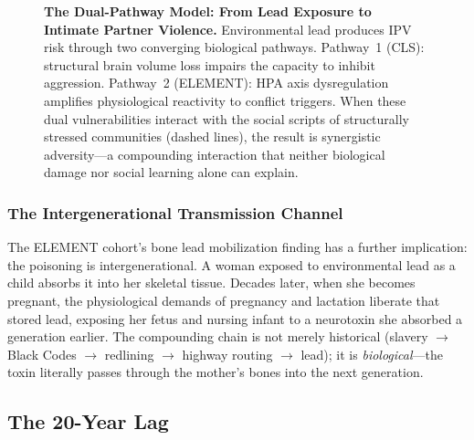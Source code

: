 \documentclass[12pt, letterpaper]{article}
\begin{document}
\begin{figure}[H]
\caption{\textbf{The Dual-Pathway Model: From Lead Exposure to Intimate Partner Violence.} Environmental lead produces IPV risk through two converging biological pathways. Pathway~1 (CLS): structural brain volume loss impairs the capacity to inhibit aggression. Pathway~2 (ELEMENT): HPA axis dysregulation amplifies physiological reactivity to conflict triggers. When these dual vulnerabilities interact with the social scripts of structurally stressed communities (dashed lines), the result is synergistic adversity---a compounding interaction that neither biological damage nor social learning alone can explain.}
\label{fig:dual_pathway}
\end{figure}

\subsubsection{The Intergenerational Transmission Channel}

The ELEMENT cohort's bone lead mobilization finding has a further implication: the poisoning is intergenerational. A woman exposed to environmental lead as a child absorbs it into her skeletal tissue. Decades later, when she becomes pregnant, the physiological demands of pregnancy and lactation liberate that stored lead, exposing her fetus and nursing infant to a neurotoxin she absorbed a generation earlier. The compounding chain is not merely historical (slavery $\rightarrow$ Black Codes $\rightarrow$ redlining $\rightarrow$ highway routing $\rightarrow$ lead); it is \textit{biological}---the toxin literally passes through the mother's bones into the next generation.

\subsection{The 20-Year Lag}
\end{document}
